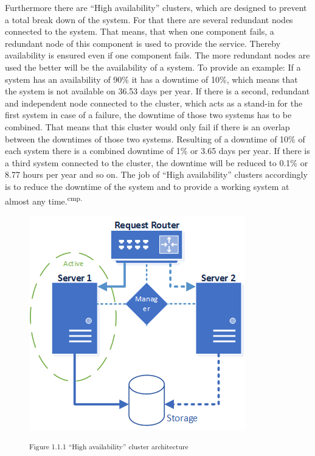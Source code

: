 
Furthermore there are ``High availability'' clusters, which are designed to prevent a total break down of the system. For that there are several redundant nodes connected to the system. That means, that when one component fails, a redundant node of this component is used to provide the service. Thereby availability is ensured even if one component fails. The more redundant nodes are used the better will be the availability of a system. To provide an example: If a system has an availability of 90\% it has a downtime of 10\%, which means that the system is not available on 36.53 days per year. If there is a second, redundant and independent node connected to the cluster, which acts as a stand-in for the first system in case of a failure, the downtime of those two systems has to be combined. That means that this cluster would only fail if there is an overlap between the downtimes of those two systems. Resulting of a downtime of 10\% of each system there is a combined downtime of 1\% or 3.65 days per year. If there is a third system connected to the cluster, the downtime will be reduced to 0.1\% or 8.77 hours per year and so on. The job of ``High availability'' clusters accordingly is to reduce the downtime of the system and to provide a working system at almost any time.\textsuperscript{cmp.\cite{9}}


\begin{figure}[h]
\centering
\includegraphics[width=\textwidth/25*10]{images/ha_cluster_architecture.png}

\textsuperscript{Figure 1.1.1 ``High availability'' cluster architecture}
\end{figure}


